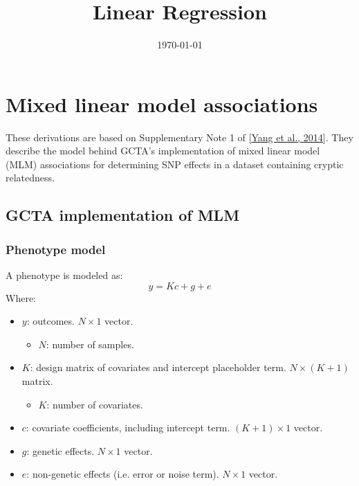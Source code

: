\documentclass[12pt]{article}
\title{Linear Regression}
\date{\today}
\begin{document}
\maketitle

\section{Mixed linear model associations}

These derivations are based on Supplementary Note 1 of [\href{https://www.nature.com/articles/ng.2876}{Yang et al., 2014}]. They describe the model behind GCTA's implementation of mixed linear model (MLM) associations for determining SNP effects in a dataset containing cryptic relatedness.

\subsection{GCTA implementation of MLM}

\subsubsection{Phenotype model}
A phenotype is modeled as:
$$ y = Kc + g + e $$
Where:
\begin{itemize}
    \item $y$: outcomes.
    $N \times 1$ vector.
    \begin{itemize}
        \item $N$: number of samples.
    \end{itemize}
    \item $K$: design matrix of covariates and intercept placeholder term.
    $N \times (K+1)$ matrix.
    \begin{itemize}
        \item $K$: number of covariates.
    \end{itemize}
    \item $c$: covariate coefficients, including intercept term.
    $(K+1) \times 1$ vector.
    \item $g$: genetic effects.
    $N \times 1$ vector.
    \item $e$: non-genetic effects (i.e. error or noise term).
    $N \times 1$ vector.
\end{itemize}
\end{document}
